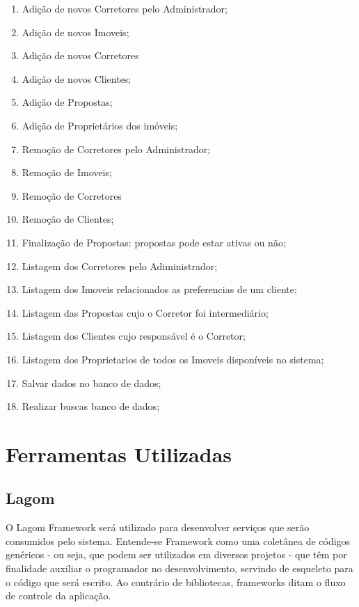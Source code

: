 \documentclass[a4paper,11pt,fleqn]{article}
\begin{document}
\begin{enumerate}
    \item Adição de novos Corretores pelo Administrador;
    \item Adição de novos Imoveis;
    \item Adição de novos Corretores
    \item Adição de novos Clientes;
    \item Adição de Propostas;
    \item Adição de Proprietários dos imóveis;
    \item Remoção de Corretores pelo Administrador;
    \item Remoção de Imoveis;
    \item Remoção de Corretores
    \item Remoção de Clientes;
    \item Finalização de Propostas: propostas pode estar ativas ou não;
    \item Listagem dos Corretores pelo Adiministrador;
    \item Listagem dos Imoveis relacionados as preferencias de um cliente;
    \item Listagem das Propostas cujo o Corretor foi intermediário;
    \item Listagem dos Clientes cujo responsável é o Corretor;
    \item Listagem dos Proprietarios de todos os Imoveis disponíveis no sistema;
    \item Salvar dados no banco de dados;
    \item Realizar buscas banco de dados;
\end{enumerate}

\section{Ferramentas Utilizadas}
\label{s:ferramentas}
\subsection{Lagom}
\label{ss:lagom}
O Lagom Framework será utilizado para desenvolver serviços que serão consumidos pelo sistema.
 Entende-se Framework como uma coletânea de códigos genéricos - ou seja, que podem ser utilizados em diversos
  projetos - que têm por finalidade auxiliar o programador no desenvolvimento, servindo de esqueleto
   para o código que será escrito. Ao contrário de bibliotecas, frameworks ditam o fluxo de controle da aplicação.
\end{document}
